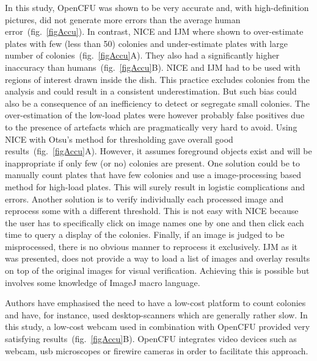 \documentclass[10pt]{article}
\newcommand{\IJM}{IJM}
\begin{document}
In this study, OpenCFU was shown to be very accurate and, with high-definition
pictures, did not generate more errors than the average human error~(fig.~\ref{figAccu}). In contrast, NICE and \IJM{} where shown to
over-estimate plates with few (less than 50) colonies and under-estimate plates
with large number of colonies~(fig.~\ref{figAccu}A). They also had a significantly
higher inaccuracy than humans~(fig.~\ref{figAccu}B). NICE and \IJM{} had to be
used with regions of interest drawn inside the dish. This practice excludes
colonies from the analysis and could result in a
consistent underestimation. But such bias could also be a consequence of an inefficiency to detect or segregate
 small colonies.
The over-estimation of the low-load plates were however probably false positives
due to the presence of artefacts which are pragmatically very hard to avoid.
Using NICE with Otsu's method for thresholding gave overall good results~(fig.~\ref{figAccu}A).
However, it assumes foreground objects exist and will be inappropriate
if only few (or no) colonies are present. One
solution could be to manually count plates that have few colonies and use a
image-processing based method for high-load plates. This will surely result in
logistic complications and errors. Another solution is to verify individually
each processed image and reprocess some with a different threshold.
This is not easy with NICE because the user has to specifically click on image
names one by one and then click each time to query a display of the colonies.
Finally, if an image is judged to be misprocessed, there is no obvious manner to
reprocess it exclusively.
\IJM{} as it was presented, does not provide a way to load a list of images and
overlay results on top of the original images for visual verification. Achieving
this is possible but involves some knowledge of ImageJ macro language.

Authors have emphasised the need to have a low-cost platform to count colonies
and have, for instance, used
desktop-scanners\cite{marotz_effective_2001,putman_simplified_2005,clarke_lowcost_2010,cai_optimized_2011
} which are generally rather slow. In this study, a low-cost webcam used in
combination with OpenCFU provided very satisfying results~(fig.~\ref{figAccu}B). OpenCFU integrates
video devices such as webcam, usb microscopes or firewire cameras in order to
facilitate this approach.
\end{document}
